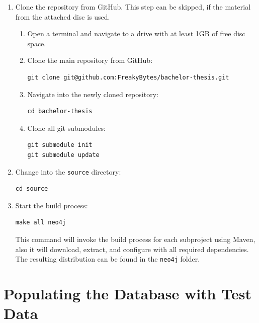 \begin{enumerate}
	\item Clone the repository from GitHub. This step can be skipped, if the material from the attached disc is used.
	\begin{enumerate}
		\item Open a terminal and navigate to a drive with at least 1GB of free disc space.
		\item Clone the main repository from GitHub:
\begin{lstlisting}
git clone git@github.com:FreakyBytes/bachelor-thesis.git
\end{lstlisting}
		\item Navigate into the newly cloned repository:
\begin{lstlisting}
cd bachelor-thesis
\end{lstlisting}
		\item Clone all git submodules:
\begin{lstlisting}
git submodule init
git submodule update
\end{lstlisting}
	\end{enumerate}

	\item Change into the \texttt{source} directory:
\begin{lstlisting}
cd source
\end{lstlisting}

	\item Start the build process:
\begin{lstlisting}
make all neo4j
\end{lstlisting}
		This command will invoke the build process for each subproject using Maven, also it will download, extract, and configure \neoj with all required dependencies. The resulting distribution can be found in the \texttt{neo4j} folder.
\end{enumerate}

\section{Populating the Database with Test Data}

